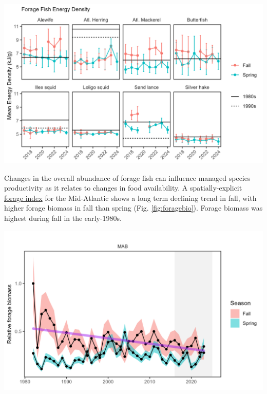 \documentclass[
  10pt,
]{article}
\let\origfigure\figure
\let\endorigfigure\endfigure
\renewenvironment{figure}[1][2] {
    \expandafter\origfigure\expandafter[H]
} {
    \endorigfigure
}
\begin{document}
\begin{figure}

{\centering \includegraphics[width=6.5in]{images/MidAtlantic/energy_density_MidAtlantic_2025-09-05} 

}

\caption{Energy density (mean and standard deviation) of eight forage species from NEFSC bottom trawl surveys by season and year, compared with limited data available from the 1980s (solid line) and 1990s (dashed line)}\label{fig:energy-density}
\end{figure}

Changes in the overall abundance of forage fish can influence managed species productivity as it relates to changes in food availability. A spatially-explicit \href{https://noaa-edab.github.io/catalog/forage_index.html}{forage index} for the Mid-Atlantic shows a long term declining trend in fall, with higher forage biomass in fall than spring (Fig. \ref{fig:foragebio}). Forage biomass was highest during fall in the early-1980s.

\begin{figure}

{\centering \includegraphics[width=6.5in]{images/MidAtlantic/foragebio_MidAtlantic_2025-09-05} 

}

\caption{Forage fish index in the MAB for spring (blue) and fall (red) surveys, with a decline (purple) in fall. Index values are relative to the maximum observation within a region across surveys.}\label{fig:foragebio}
\end{figure}
\end{document}

